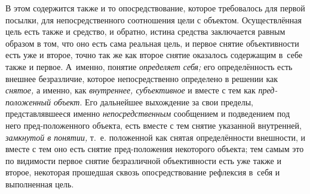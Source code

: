 В этом содержится также и то опосредствование, которое
требовалось для первой посылки, для непосредственного соотношения цели с
объектом. Осуществлённая цель есть также и средство, и обратно, истина
средства заключается равным образом в том, что оно есть сама реальная цель,
и первое снятие объективности есть уже и второе, точно так же как второе
снятие оказалось содержащим в~себе также и первое. А~именно, понятие
{\em определяет себя;} его определённость есть внешнее безразличие, которое
непосредственно определено в решении как {\em снятое,} а именно,
как {\em внутреннее, субъективное} и вместе с тем как {\em пред-положенный
объект}. Его дальнейшее выхождение за свои пределы, представлявшееся именно
{\em непосредственным}
сообщением и подведением под него пред-положенного объекта,
есть вместе с тем снятие указанной внутренней, {\em замкнутой в понятии,}
т.~е. положенной как снятая определённости внешности, и
вместе с тем оно есть снятие пред-положения некоторого объекта; тем самым
это по видимости первое снятие безразличной объективности
есть уже также и второе, некоторая прошедшая сквозь опосредствование
рефлексия в~себя и выполненная цель.

